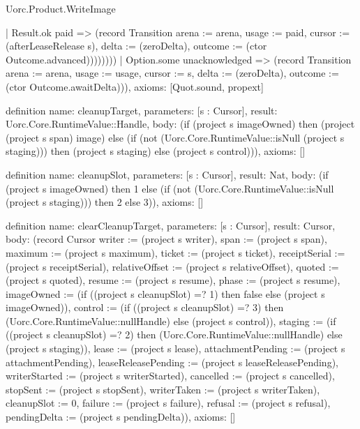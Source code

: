 \begin{lexlean}{Uorc.Product.WriteImage}
\begin{semanticmodule}
{        | Result.ok paid => (record Transition {arena := arena, usage := paid, cursor := (afterLeaseRelease s), delta := (zeroDelta), outcome := (ctor Outcome.advanced)})))))))
    | Option.some unacknowledged => (record Transition {arena := arena, usage := usage, cursor := s, delta := (zeroDelta), outcome := (ctor Outcome.awaitDelta)})),
  axioms: [Quot.sound, propext]
}

definition{
  name: cleanupTarget,
  parameters: [s : Cursor],
  result: Uorc.Core.RuntimeValue::Handle,
  body: (if (project s imageOwned) then (project (project s span) image) else (if (not (Uorc.Core.RuntimeValue::isNull (project s staging))) then (project s staging) else (project s control))),
  axioms: []
}

definition{
  name: cleanupSlot,
  parameters: [s : Cursor],
  result: Nat,
  body: (if (project s imageOwned) then 1 else (if (not (Uorc.Core.RuntimeValue::isNull (project s staging))) then 2 else 3)),
  axioms: []
}

definition{
  name: clearCleanupTarget,
  parameters: [s : Cursor],
  result: Cursor,
  body: (record Cursor {writer := (project s writer), span := (project s span), maximum := (project s maximum), ticket := (project s ticket), receiptSerial := (project s receiptSerial), relativeOffset := (project s relativeOffset), quoted := (project s quoted), resume := (project s resume), phase := (project s resume), imageOwned := (if ((project s cleanupSlot) =? 1) then false else (project s imageOwned)), control := (if ((project s cleanupSlot) =? 3) then (Uorc.Core.RuntimeValue::nullHandle) else (project s control)), staging := (if ((project s cleanupSlot) =? 2) then (Uorc.Core.RuntimeValue::nullHandle) else (project s staging)), lease := (project s lease), attachmentPending := (project s attachmentPending), leaseReleasePending := (project s leaseReleasePending), writerStarted := (project s writerStarted), cancelled := (project s cancelled), stopSent := (project s stopSent), writerTaken := (project s writerTaken), cleanupSlot := 0, failure := (project s failure), refusal := (project s refusal), pendingDelta := (project s pendingDelta)}),
  axioms: []
}


\end{semanticmodule}
\end{lexlean}
